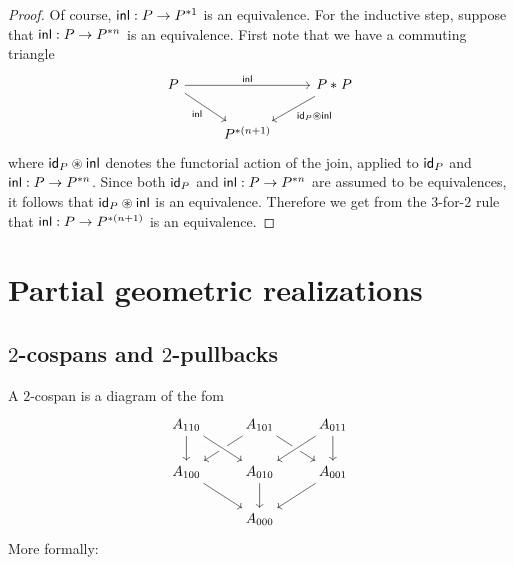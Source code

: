 \begin{proof}
Of course, $\inl:P\to P^{\ast 1}$ is an equivalence. For the inductive step,
suppose that $\inl:P\to P^{\ast n}$ is an equivalence. First note that
we have a commuting triangle
\begin{equation*}
\begin{tikzcd}
P \arrow[rr,"\inl"] \arrow[dr,swap,"\inl"] & & \join{P}{P} \arrow[dl,"{\idfunc[P] \circledast\inl}"] \\
& P^{\ast(n+1)}
\end{tikzcd}
\end{equation*}
where $\idfunc[P] \circledast\inl$ denotes the functorial action of the join, applied
to $\idfunc[P]$ and $\inl:P\to P^{\ast n}$. Since both $\idfunc[P]$ and
$\inl:P\to P^{\ast n}$ are assumed to be equivalences, it follows that
$\idfunc[P]\circledast \inl$ is an equivalence. Therefore we get from the
$3$-for-$2$ rule that $\inl:P\to P^{\ast (n+1)}$ is an equivalence. 
\end{proof}

\section{Partial geometric realizations}
\subsection{$2$-cospans and $2$-pullbacks}

A $2$-cospan is a diagram of the fom
\begin{equation*}
\begin{tikzcd}
A_{110} \arrow[d] & A_{101} \arrow[dl] \arrow[dr] & A_{011} \arrow[d] \\
A_{100} \arrow[dr] & A_{010} \arrow[d] \arrow[from=ul,crossing over] \arrow[from=ur,crossing over] & A_{001} \arrow[dl] \\
& A_{000}
\end{tikzcd}
\end{equation*}
More formally:

